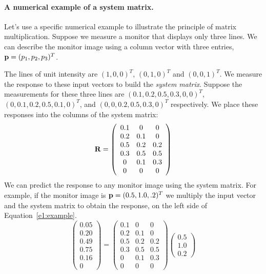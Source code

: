 \paragraph{A numerical example of a system matrix. }
Let's use a specific numerical example to illustrate the principle
of matrix multiplication.
Suppose we measure a monitor that displays only three lines.
We can describe the monitor image using
a column vector with three entries, $\mbox {$\bf p$} = (p_1, p_2, p_3)^T$.

The lines of unit intensity are
$(1,0,0)^T$, $(0,1,0)^T$ and $(0,0,1)^T$.
We measure the response to these input vectors
to build the {\em system matrix}.
Suppose the measurements for these three lines are
$(0.1,0.2,0.5,0.3,0,0)^T$, $(0,0.1,0.2,0.5,0.1,0)^T$, and
$(0,0,0.2,0.5,0.3,0)^T$ respectively.
We place these responses into the columns of the system matrix:
\begin{equation}
\mbox {$\bf R$} = 
\left (
 \begin{array}{ccc}
   0.1 & 0 & 0 \\
   0.2 & 0.1 & 0 \\
   0.5 & 0.2 & 0.2 \\
   0.3 & 0.5 & 0.5 \\
   0   & 0.1 & 0.3 \\
   0   & 0   & 0 
  \end{array}
\right )
\end{equation}
We can predict the response to any monitor
image using the system matrix.
For example, if the
monitor image is $\mbox {$\bf p$} = (0.5,1.0,.2)^T$
we multiply the input vector and the system matrix to obtain
the response, on the left side of Equation~\ref{e1:example}.
\begin{equation}
\label{e1:example}
 \left (
  \begin{array}{c}
    0.05 \\
    0.20 \\
    0.49 \\
    0.75 \\
    0.16 \\
    0
  \end{array}
 \right )
= 
 \left (
  \begin{array}{ccc}
   0.1 & 0 & 0 \\
   0.2 & 0.1 & 0 \\
   0.5 & 0.2 & 0.2 \\
   0.3 & 0.5 & 0.5 \\
   0   & 0.1 & 0.3 \\
   0   & 0   & 0 
  \end{array}
 \right )
 \left (
  \begin{array}{c}
   0.5 \\
   1.0 \\
   0.2
  \end{array}
 \right )
\end{equation}

